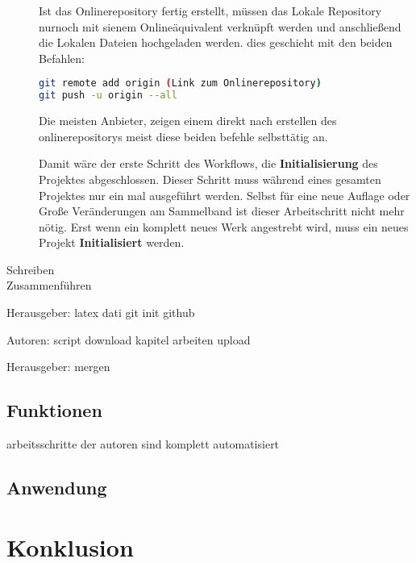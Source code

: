 \documentclass[12pt,a4paper]{scrartcl}
\begin{document}
\begin{description}
Ist das Onlinerepository fertig erstellt, müssen das Lokale Repository nurnoch mit sienem Onlineäquivalent verknüpft werden und anschließend die Lokalen Dateien hochgeladen werden. dies geschieht mit den beiden Befahlen:
\begin{lstlisting}[language=bash]
git remote add origin (Link zum Onlinerepository)
git push -u origin --all
\end{lstlisting} 
Die meisten Anbieter, zeigen einem direkt nach erstellen des onlinerepositorys meist diese beiden befehle selbsttätig an.

Damit wäre der erste Schritt des Workflows, die \textbf{Initialisierung} des Projektes abgeschlossen. Dieser Schritt muss während eines gesamten Projektes nur ein mal ausgeführt werden. Selbst für eine neue Auflage oder Große Veränderungen am Sammelband ist dieser Arbeitschritt nicht mehr nötig. Erst wenn ein komplett neues Werk angestrebt wird, muss ein neues Projekt \textbf{Initialisiert} werden.
\item[Schreiben] 

\item[Zusammenführen] 
\end{description}

Herausgeber:
latex dati
git init
github

Autoren:
script
download
kapitel
arbeiten upload

Herausgeber:
mergen

\subsection{Funktionen}

arbeitsschritte der autoren sind komplett automatisiert

\subsection{Anwendung}

\section{Konklusion}
\end{document}
